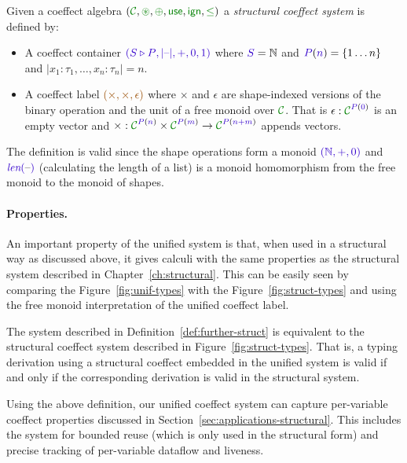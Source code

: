 \begin{definition}
\label{def:further-struct}
Given a coeffect algebra $(\C, \cseq, \cpar, \cunit, \czero, \cleq)$ a \emph{structural coeffect system}
is defined by:

\begin{itemize}
\item A coeffect container $\sclrd{(\SHP, {|}\textnormal{--}{|}, +, 0, 1)}$ where $\SH=\mathbb{N}$ and
  $\SP(\sclrd{n})=\{ 1 \ldots n \}$ and  ${|}x_1\!:\!\tau_1,\ldots,x_n\!:\!\tau_n{|}=n$.

\item A coeffect label $\aclrd{(\times, \times, \epsilon)}$ where $\times$ and $\epsilon$ are
  shape-indexed versions of the binary operation and the unit of a free monoid over $\C$.
  That is $\epsilon : \C^{\SP(\sclrd{0})}$ is an empty vector and
  $\times : \C^{\SP(\sclrd{n})} \times \C^{\SP(\sclrd{m})} \rightarrow \C^{\SP(\sclrd{n + m})}$
  appends vectors.
\end{itemize}
\end{definition}

\noindent
The definition is valid since the shape operations form a monoid
$\sclrd{(\mathbb{N}, +, 0)}$ and $\slen{\textnormal{--}}$ (calculating the length of
a list) is a monoid homomorphism from the free monoid to the monoid of
shapes.

\paragraph{Properties.}
An important property of the unified system is that, when used in a structural way as discussed
above, it gives calculi with the same properties as the structural system described in
Chapter~\ref{ch:structural}. This can be easily seen by comparing the Figure~\ref{fig:unif-types}
with the Figure~\ref{fig:struct-types} and using the free monoid interpretation of the unified
coeffect label.

\begin{remark}
The system described in Definition~\ref{def:further-struct} is equivalent to the structural coeffect
system described in Figure~\ref{fig:struct-types}. That is, a typing derivation using a structural
coeffect embedded in the unified system is valid if and only if the corresponding derivation is
valid in the structural system.
\end{remark}

\noindent
Using the above definition, our unified coeffect system can capture per-variable coeffect properties
discussed in Section~\ref{sec:applications-structural}. This includes the system for bounded reuse
(which is only used in the structural form) and precise tracking of per-variable dataflow and liveness.

